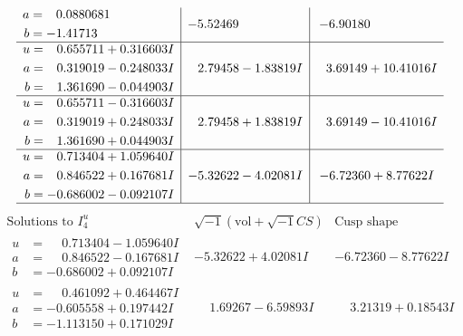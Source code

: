 \documentclass[1p]{elsarticle_modified}
\theoremstyle{definition}
\newcommand{\I}{\sqrt{-1}}
\begin{document}
$$\begin{array}{c|c|c}
\begin{aligned}
a &= \phantom{-}0.0880681\phantom{ +0.000000I} \\
b &= -1.41713\phantom{ +0.000000I}\end{aligned}
 & -5.52469\phantom{ +0.000000I} & -6.90180\phantom{ +0.000000I} \\ \hline\begin{aligned}
u &= \phantom{-}0.655711 + 0.316603 I \\
a &= \phantom{-}0.319019 - 0.248033 I \\
b &= \phantom{-}1.361690 - 0.044903 I\end{aligned}
 & \phantom{-}2.79458 - 1.83819 I & \phantom{-}3.69149 + 10.41016 I \\ \hline\begin{aligned}
u &= \phantom{-}0.655711 - 0.316603 I \\
a &= \phantom{-}0.319019 + 0.248033 I \\
b &= \phantom{-}1.361690 + 0.044903 I\end{aligned}
 & \phantom{-}2.79458 + 1.83819 I & \phantom{-}3.69149 - 10.41016 I \\ \hline\begin{aligned}
u &= \phantom{-}0.713404 + 1.059640 I \\
a &= \phantom{-}0.846522 + 0.167681 I \\
b &= -0.686002 - 0.092107 I\end{aligned}
 & -5.32622 - 4.02081 I & -6.72360 + 8.77622 I\\
 \hline 
 \end{array}$$\newpage$$\begin{array}{c|c|c}  
\text{Solutions to }I^u_{4}& \I (\text{vol} + \sqrt{-1}CS) & \text{Cusp shape}\\
 \hline 
\begin{aligned}
u &= \phantom{-}0.713404 - 1.059640 I \\
a &= \phantom{-}0.846522 - 0.167681 I \\
b &= -0.686002 + 0.092107 I\end{aligned}
 & -5.32622 + 4.02081 I & -6.72360 - 8.77622 I \\ \hline\begin{aligned}
u &= \phantom{-}0.461092 + 0.464467 I \\
a &= -0.605558 + 0.197442 I \\
b &= -1.113150 + 0.171029 I\end{aligned}
 & \phantom{-}1.69267 - 6.59893 I & \phantom{-}3.21319 + 0.18543 I \\ \hline\begin{aligned}

\end{aligned}
\end{array}$$
\end{document}
